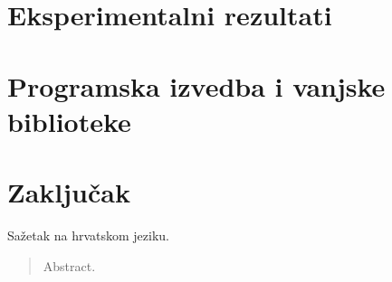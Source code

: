 \documentclass[times, utf8, zavrsni, numeric]{fer}
\begin{document}
\chapter{Eksperimentalni rezultati}
\chapter{Programska izvedba i vanjske biblioteke}
\chapter{Zaključak}





\begin{sazetak}
Sažetak na hrvatskom jeziku.

\end{sazetak}

\begin{abstract}
Abstract.

\end{abstract}
\end{document}
